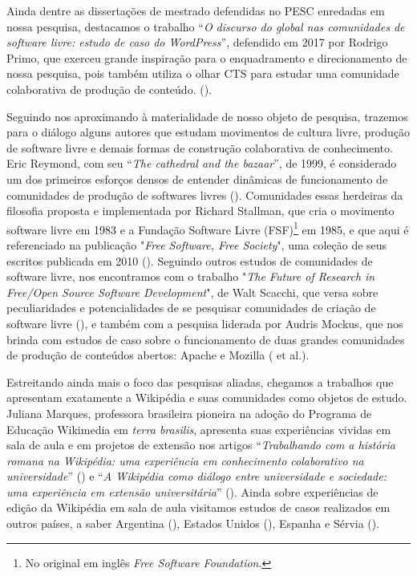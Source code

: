 Ainda dentre as dissertações de mestrado defendidas no PESC enredadas em nossa pesquisa, destacamos o trabalho ``\textit{O discurso do global nas comunidades de software livre: estudo de caso do WordPress}'', defendido em 2017 por Rodrigo Primo, que exerceu grande inspiração para o enquadramento e direcionamento de nossa pesquisa, pois também utiliza o olhar CTS para estudar uma comunidade colaborativa de produção de conteúdo. (\cite{primo_o_2017}).

Seguindo nos aproximando à materialidade de nosso objeto de pesquisa, trazemos para o diálogo alguns autores que estudam movimentos de cultura livre, produção de software livre e demais formas de construção colaborativa de conhecimento. Eric Reymond, com seu ``\textit{The cathedral and the bazaar}'', de 1999, é considerado um dos primeiros esforços densos de entender dinâmicas de funcionamento de comunidades de produção de softwares livres (\cite{raymond_bazaar_1999}). Comunidades essas herdeiras da filosofia proposta e implementada por Richard Stallman, que cria o movimento software livre em 1983 e a Fundação Software Livre (FSF)\footnote{No original em inglês \textit{Free Software Foundation}.} em 1985, e que aqui é referenciado na publicação "\textit{Free Software, Free Society}", uma coleção de seus escritos publicada em 2010 (\cite{stallman_free_2010}). Seguindo outros estudos de comunidades de software livre, nos encontramos com o trabalho "\textit{The Future of Research in Free/Open Source Software Development}", de Walt Scacchi, que versa sobre peculiaridades e potencialidades de se pesquisar comunidades de criação de software livre (\cite{scacchi_future_2010}), e também com a pesquisa liderada por Audris Mockus, que nos brinda com estudos de caso sobre o funcionamento de duas grandes comunidades de produção de conteúdos abertos: Apache e Mozilla (\cite{mockus_two_2002} et al.).

Estreitando ainda mais o foco das pesquisas aliadas, chegamos a trabalhos que apresentam exatamente a Wikipédia e suas comunidades como objetos de estudo. Juliana Marques, professora brasileira pioneira na adoção do Programa de Educação Wikimedia em \textit{terra brasilis}, apresenta suas experiências vividas em sala de aula e em projetos de extensão nos artigos ``\textit{Trabalhando com a história romana na Wikipédia: uma experiência em conhecimento colaborativo na universidade}'' (\cite{marques_trabalhando_2012}) e ``\textit{A Wikipédia como diálogo entre universidade e sociedade: uma experiência em extensão universitária}'' (\cite{marques_wikipedia_2013}). Ainda sobre experiências de edição da Wikipédia em sala de aula visitamos estudos de casos realizados em outros países, a saber Argentina (\cite{archuby_experiencias_2018}), Estados Unidos (\cite{carver_assigning_2012}), Espanha e Sérvia (\cite{soler-adillon_wikipedia_2018}).

